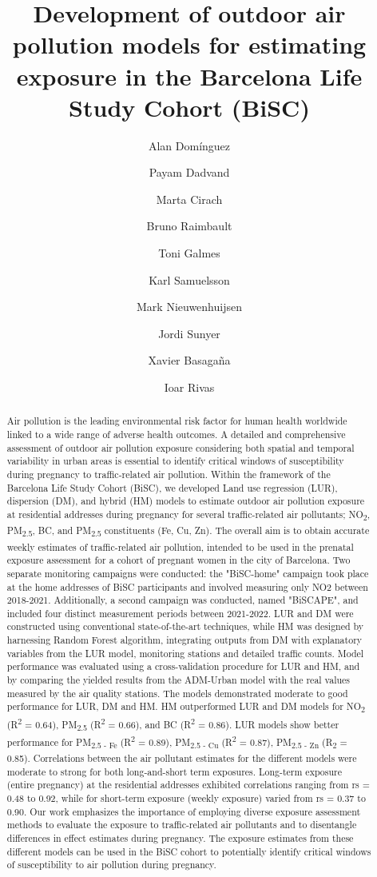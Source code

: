 \documentclass{article}
\title{\textbf{Development of outdoor air pollution models for estimating exposure in the Barcelona Life Study Cohort (BiSC)}}
\author[1, 2, 3]{Alan Domínguez}
\author[1, 3, 4]{Payam Dadvand}
\author[1]{Marta Cirach}
\author[1]{Bruno Raimbault}
\author[1]{Toni Galmes}
\author[1]{Karl Samuelsson}
\author[1, 2, 3]{Mark Nieuwenhuijsen}
\author[1, 2, 3]{Jordi Sunyer}
\author[1, 2, 3]{Xavier Basagaña}
\author[1, 2, 3]{Ioar Rivas}
\affil[1]{Barcelona Institute for Global Health (ISGlobal), Barcelona, Spain.}
\affil[2]{Universitat Pompeu Fabra (UPF), Barcelona, Spain.}
\affil[3]{CIBER Epidemiología y Salud Pública (CIBERESP), Madrid, Spain.}
\affil[4]{London School of Hygiene and Tropical Medicine (LSHTM), London, UK.}
\begin{document}
\maketitle

\begin{abstract}

Air pollution is the leading environmental risk factor for human health worldwide linked to a wide range of adverse health outcomes. A detailed and comprehensive assessment of outdoor air pollution exposure considering both spatial and temporal variability in urban areas is essential to identify critical windows of susceptibility during pregnancy to traffic-related air pollution. Within the framework of the Barcelona Life Study Cohort (BiSC), we developed Land use regression (LUR), dispersion (DM), and hybrid (HM) models to estimate outdoor air pollution exposure at residential addresses during pregnancy for several traffic-related air pollutants; NO\textsubscript{2}, PM\textsubscript{2.5}, BC, and PM\textsubscript{2.5} constituents (Fe, Cu, Zn). The overall aim is to obtain accurate weekly estimates of traffic-related air pollution, intended to be used in the prenatal exposure assessment for a cohort of pregnant women in the city of Barcelona. Two separate monitoring campaigns were conducted: the "BiSC-home" campaign took place at the home addresses of BiSC participants and involved measuring only NO2 between 2018-2021. Additionally, a second campaign was conducted, named "BiSCAPE", and included four distinct measurement periods between 2021-2022. LUR and DM were constructed using conventional state-of-the-art techniques, while HM was designed by harnessing Random Forest algorithm, integrating outputs from DM with explanatory variables from the LUR model, monitoring stations and detailed traffic counts. Model performance was evaluated using a cross-validation procedure for LUR and HM, and by comparing the yielded results from the ADM-Urban model with the real values measured by the air quality stations. The models demonstrated moderate to good performance for LUR, DM and HM. HM outperformed LUR and DM models for NO\textsubscript{2} (R\textsuperscript{2} = 0.64), PM\textsubscript{2.5} (R\textsuperscript{2} = 0.66), and BC (R\textsuperscript{2} = 0.86). LUR models show better performance for PM\textsubscript{2.5 - Fe} (R\textsuperscript{2} = 0.89), PM\textsubscript{2.5 - Cu} (R\textsuperscript{2} = 0.87), PM\textsubscript{2.5 - Zn} (R\textsubscript{2} = 0.85). Correlations between the air pollutant estimates for the different models were moderate to strong for both long-and-short term exposures. Long-term exposure (entire pregnancy) at the residential addresses exhibited correlations ranging from rs = 0.48 to 0.92, while for short-term exposure (weekly exposure) varied from rs = 0.37 to 0.90. Our work emphasizes the importance of employing diverse exposure assessment methods to evaluate the exposure to traffic-related air pollutants and to disentangle differences in effect estimates during pregnancy. The exposure estimates from these different models can be used in the BiSC cohort to potentially identify critical windows of susceptibility to air pollution during pregnancy. 


\end{abstract}
\end{document}
